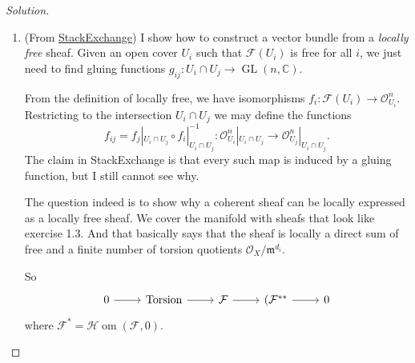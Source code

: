 \begin{proof}[Solution]\leavevmode
	\begin{enumerate}[label=\alph*.]
		\item (From \href{https://math.stackexchange.com/questions/2725664/vector-bundle-locally-free-sheaf}{StackExchange}) I show how to construct a vector bundle from a \textit{locally free} sheaf. Given an open cover $U_i$ such that $\mathcal{F}(U_i)$ is free for all $i$, we just need to find gluing functions $g_{ij}:U_i\cap U_j\to \operatorname{GL}(n,\mathbb{C}) $.

		From the definition of locally free, we have isomorphisms $f_i:\mathcal{F}(U_i)\to \mathcal{O}^n_{U_i}$. Restricting to the intersection $U_i\cap U_j$ we may define the functions
	\[f_{ij}=f_j|_{U_i\cap U_j}\circ f_i|_{U_i\cap U_j}^{-1} :\mathcal{O}^n_{U_i}|_{U_i\cap U_j}\to \mathcal{O}^n_{U_j}|_{U_i\cap U_j}.\]
	The claim in StackExchange is that every such map is induced by a gluing function, but I still cannot see why.

	The question indeed is to show why a coherent sheaf can be locally expressed as a locally free sheaf. We cover the manifold with sheafs that look like exercise 1.3. And that basically says that the sheaf is locally a direct sum of free and a finite number of torsion quotients $\mathcal{O}_X/\mathfrak{m}^{d_i}$.

	So
	\[\begin{tikzcd}
		0\arrow[r]&\text{Torsion} \arrow[r]&\mathcal{F}\arrow[r]&(\mathcal{F}^{**}\arrow[r]&0
	\end{tikzcd}\]
	where $\mathcal{F}^* =\mathcal{H}\operatorname{om}(\mathcal{F},0)$.

	\iffalse\begin{remark}
		(\href{https://math.stackexchange.com/questions/2597356/vector-bundle-associated-to-a-locally-free-sheaf}{StackExchange}) The equivalence of the categories of vector bundles and locally free sheaves is given by the functor
		\[\mathcal{E}\mapsto \operatorname{Spec}(\operatorname{Sym}(\mathcal{E})),\quad E\mapsto \Gamma^\vee_{E/X^\bullet}\]
	\end{remark}\fi
	\end{enumerate}
\end{proof}

\printbibliography


